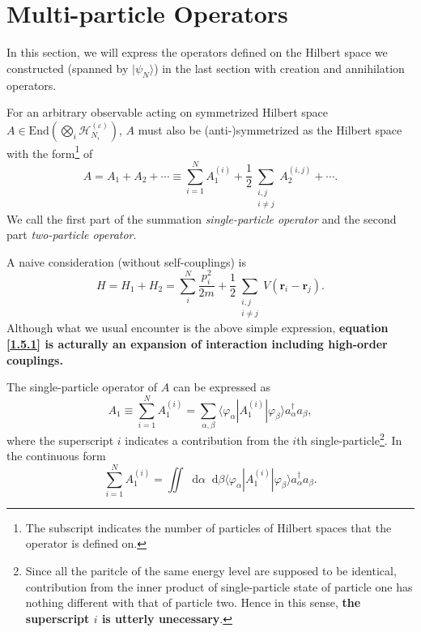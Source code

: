 \documentclass[b5paper,10pt,UTF8]{book}
\newcommand*\dd{\mathop{}\!\mathrm{d}}
\numberwithin{equation}{section}
\begin{document}
	\section{Multi-particle Operators}
		In this section, we will express the operators defined on the Hilbert space we constructed (spanned by $|\psi_N\rangle$) in the last section with creation and annihilation operators. 
		\begin{Def}
			For an arbitrary observable acting on symmetrized Hilbert space $A\in\mathrm{End}\left(\displaystyle\bigotimes_{i}\mathcal{H}_{N_i}^{(\varepsilon)}\right)$, $A$ must also be (anti-)symmetrized as the Hilbert space with the form\footnote{The subscript indicates the number of particles of Hilbert spaces that the operator is defined on.} of
			\begin{equation}\label{1.5.1}
				A=A_1+A_2+\cdots\equiv\sum_{i=1}^N A^{(i)}_1+\dfrac{1}{2}\sum_{\substack{i,j\\i\neq j}}A_2^{(i,j)}+\cdots.
			\end{equation}
			We call the first part of the summation \emph{single-particle operator} and the second part \emph{two-particle operator}.
		\end{Def}
		\begin{Example}
			A naive consideration (without self-couplings) is 
			$$ H=H_1+H_2=\sum_i^N\dfrac{p_i^2}{2m}+\dfrac{1}{2}\sum_{\substack{i,j\\i\neq j}}V(\bm{r}_i-\bm{r}_j).$$
			Although what we usual encounter is the above simple expression, \textbf{equation \eqref{1.5.1} is acturally an expansion of interaction including high-order couplings.}
		\end{Example}
		\begin{Proposition}
			The single-particle operator of $A$ can be expressed as
			\begin{equation}\label{1.5.2}
				A_1\equiv\sum_{i=1}^N A^{(i)}_1=\sum_{\alpha,\beta}\langle\varphi_\alpha|A_1^{(i)}|\varphi_\beta\rangle a_\alpha^\dagger a_\beta,
			\end{equation}
			where the superscript $i$ indicates a contribution from the $i$th single-particle\footnote{Since all the paritcle of the same energy level are supposed to be identical, contribution from the inner product of single-particle state of particle one has nothing different with that of particle two. Hence in this sense, \textbf{the superscript $i$ is utterly unecessary}.}. In the continuous form
			$$\sum_{i=1}^N A^{(i)}_1=\iint\dd\alpha\dd\beta\langle\varphi_\alpha|A_1^{(i)}|\varphi_\beta\rangle a_\alpha^\dagger a_\beta.$$
		\end{Proposition}
\end{document}
